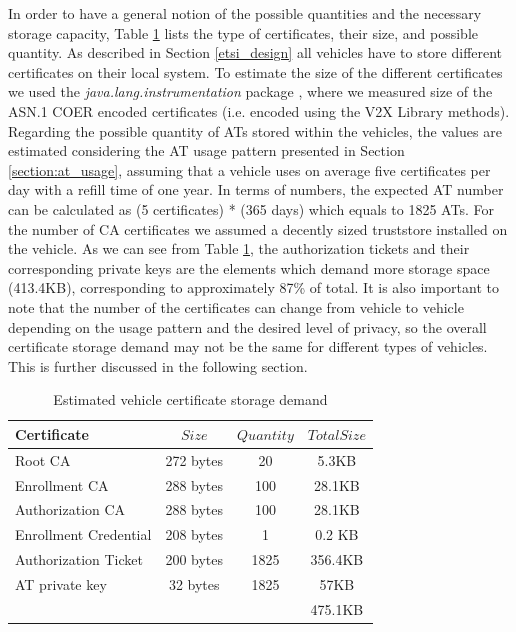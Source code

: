 		In order to have a general notion of the possible quantities and the necessary storage capacity, Table \ref{tab:table3} lists the type of certificates, their size, and possible quantity. As described in Section \ref{etsi_design} all vehicles have to store different certificates on their local system. To estimate the size of the different certificates we used the \textit{java.lang.instrumentation} package \cite{instrumentation}, where we measured size of the ASN.1 COER encoded certificates (i.e. encoded using the V2X Library methods). Regarding the possible quantity of ATs stored within the vehicles, the values are estimated considering the AT usage pattern presented in Section \ref{section:at_usage}, assuming that a vehicle uses on average five certificates per day with a refill time of one year. In terms of numbers, the expected AT number can be calculated as (5 certificates) * (365 days) which equals to 1825 ATs. For the number of CA certificates we assumed a decently sized truststore installed on the vehicle. As we can see from Table \ref{tab:table3}, the authorization tickets and their corresponding private keys are the elements which demand more storage space (413.4KB), corresponding to approximately 87\% of total. It is also important to note that the number of the certificates can change from vehicle to vehicle depending on the usage pattern and the desired level of privacy, so the overall certificate storage demand may not be the same for different types of vehicles. This is further discussed in the following section.
		
		\begin{table}
			\renewcommand{\arraystretch}{1.2} %
			\centering
			\begin{tabular}{lccc}
				\toprule
				Certificate & $Size$ & $Quantity$& $TotalSize$ \\
				\midrule
				Root CA         & 272 bytes & 20 &5.3KB \\
				Enrollment CA  & 288 bytes &100&28.1KB \\
				Authorization CA  & 288 bytes&100&28.1KB\\
				Enrollment Credential  & 208 bytes &1 & 0.2 KB\\
				Authorization Ticket  & 200 bytes &1825 & 356.4KB\\
				AT private key & 32 bytes & 1825 & 57KB\\
				\midrule
				\null  & \null & \null & 475.1KB\\
				\bottomrule
			\end{tabular}
			
			\caption{Estimated vehicle certificate storage demand}
			\label{tab:table3}
		\end{table} 
		
